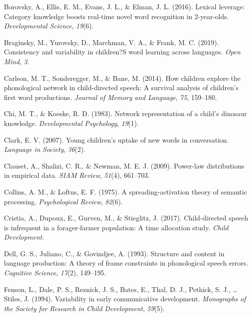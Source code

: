 \documentclass[english,,man,floatsintext]{apa6}
\begin{document}
\leavevmode\hypertarget{ref-borovsky2016}{}%
Borovsky, A., Ellis, E. M., Evans, J. L., \& Elman, J. L. (2016). Lexical leverage: Category knowledge boosts real-time novel word recognition in 2-year-olds. \emph{Developmental Science}, \emph{19}(6).

\leavevmode\hypertarget{ref-braginsky2019}{}%
Braginsky, M., Yurovsky, D., Marchman, V. A., \& Frank, M. C. (2019). Consistency and variability in children?S word learning across languages. \emph{Open Mind}, \emph{3}.

\leavevmode\hypertarget{ref-carlson2014}{}%
Carlson, M. T., Sonderegger, M., \& Bane, M. (2014). How children explore the phonological network in child-directed speech: A survival analysis of children's first word productions. \emph{Journal of Memory and Language}, \emph{75}, 159--180.

\leavevmode\hypertarget{ref-chi1983}{}%
Chi, M. T., \& Koeske, R. D. (1983). Network representation of a child's dinosaur knowledge. \emph{Developmental Psychology}, \emph{19}(1).

\leavevmode\hypertarget{ref-clark2007}{}%
Clark, E. V. (2007). Young children's uptake of new words in conversation. \emph{Language in Society}, \emph{36}(2).

\leavevmode\hypertarget{ref-clauset09}{}%
Clauset, A., Shalizi, C. R., \& Newman, M. E. J. (2009). Power-law distributions in empirical data. \emph{SIAM Review}, \emph{51}(4), 661--703.

\leavevmode\hypertarget{ref-collins1975}{}%
Collins, A. M., \& Loftus, E. F. (1975). A spreading-activation theory of semantic processing. \emph{Psychological Review}, \emph{82}(6).

\leavevmode\hypertarget{ref-cristia2017}{}%
Cristia, A., Dupoux, E., Gurven, M., \& Stieglitz, J. (2017). Child-directed speech is infrequent in a forager-farmer population: A time allocation study. \emph{Child Development}.

\leavevmode\hypertarget{ref-dell1993}{}%
Dell, G. S., Juliano, C., \& Govindjee, A. (1993). Structure and content in language production: A theory of frame constraints in phonological speech errors. \emph{Cognitive Science}, \emph{17}(2), 149--195.

\leavevmode\hypertarget{ref-fenson94}{}%
Fenson, L., Dale, P. S., Reznick, J. S., Bates, E., Thal, D. J., Pethick, S. J., \ldots{} Stiles, J. (1994). Variability in early communicative development. \emph{Monographs of the Society for Research in Child Development}, \emph{59}(5).
\end{document}
